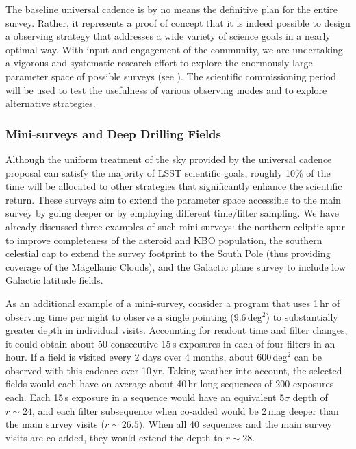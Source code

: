 The baseline universal cadence is by no means the definitive plan for the entire
survey. Rather, it represents a proof of concept that it is indeed possible to
design a observing strategy that addresses a wide variety of science goals in a nearly
optimal way. With input and engagement of the community, we are
undertaking a vigorous and systematic research effort to explore
the enormously large parameter space of possible surveys (see \citealt{2017arXiv170804058L}).
The scientific commissioning period will be used to test the usefulness of various observing
modes and to explore alternative strategies.

\subsubsection{Mini-surveys and Deep Drilling Fields}
\label{Sec:minisurveys}

Although the uniform treatment of the sky provided by the universal cadence
proposal can satisfy the majority of LSST scientific goals, roughly 10\%
of the time will be allocated to other strategies that significantly enhance the
scientific return.  These surveys aim to extend the parameter space accessible
to the main survey by going deeper or by employing different time/filter
sampling.  We have already discussed three examples of such
mini-surveys: the northern ecliptic spur to improve completeness of
the asteroid and KBO population, the southern celestial cap to extend
the survey footprint to the South Pole (thus providing coverage of the
Magellanic Clouds), and the Galactic plane survey to include low
Galactic latitude fields.

As an additional  example of a mini-survey, consider a program that
uses 1\,hr of
observing time per night to observe a single pointing (9.6\,deg$^2$) to
substantially greater depth in individual visits. Accounting for
readout time and filter changes, it could obtain about 50 consecutive
15\,s exposures in each of four filters in an hour. If a field is visited
every 2 days over 4 months, about 600\,deg$^2$ can be observed with this
cadence over 10\,yr. Taking weather into account, the selected fields would
each have on average about 40\,hr long sequences of 200 exposures each. Each
15\,s exposure in a sequence would have an equivalent 5$\sigma$ depth of
$r\sim24$, and each filter subsequence when co-added would be 2\,mag
deeper than the main survey visits ($r\sim26.5$). When all 40 sequences and
the main survey visits are co-added, they would extend the depth to $r\sim28$.

